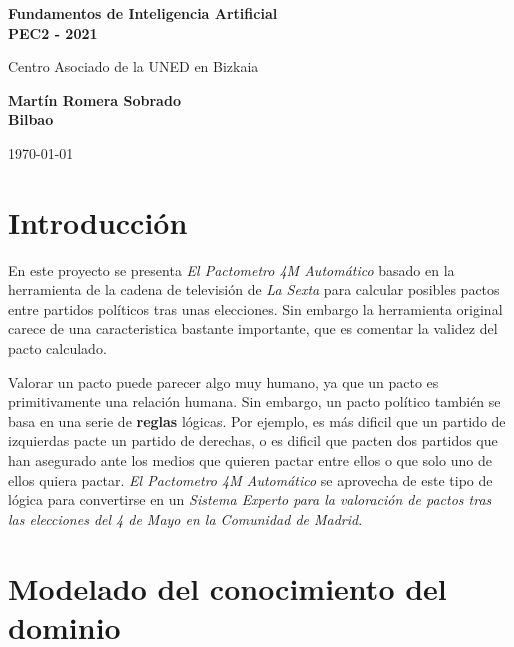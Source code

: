 \documentclass[a4paper, 12pt]{article}
\begin{document}
    \begin{titlepage}
        
        \centering
		\vspace*{1cm}
		
		\Huge
		\textbf{Fundamentos de Inteligencia Artificial}\\
		\textbf{PEC2 - 2021}
		
		\vspace{0.5cm}
		\LARGE
		Centro Asociado de la UNED en Bizkaia\\
		\vspace{1.5cm}
		
		\textbf{Martín Romera Sobrado}\\
		\textbf{Bilbao}
		
		\vfill
		
		\vspace{0.8cm}
		\Large
		\today

    \end{titlepage}

	\tableofcontents
	\newpage

	\section{Introducción}

		En este proyecto se presenta \textit{El Pactometro 4M Automático} basado 
	en la herramienta de la cadena de televisión de \textit{La Sexta} para 
	calcular posibles pactos entre partidos políticos tras unas elecciones. Sin 
	embargo la herramienta original carece de una caracteristica bastante 
	importante, que es comentar la validez del pacto calculado.\\\mbox{}

		Valorar un pacto puede parecer algo muy humano, ya que un pacto es 
	primitivamente una relación humana. Sin embargo, un pacto político también
	se basa en una serie de \textbf{reglas} lógicas. Por ejemplo, es más dificil
	que un partido de izquierdas pacte un partido de derechas, o es dificil que 
	pacten dos partidos que han asegurado ante los medios que quieren pactar 
	entre ellos o que solo uno de ellos quiera pactar. \textit{El Pactometro 4M 
	Automático} se aprovecha de este tipo de lógica para convertirse en un 
	\textit{Sistema Experto para la valoración de pactos tras las elecciones del
	4 de Mayo en la Comunidad de Madrid}.\\\mbox{}

	\section{Modelado del conocimiento del dominio}
\end{document}
